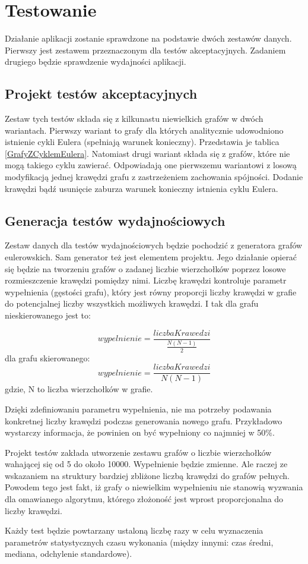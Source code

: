 \section{Testowanie}

Działanie aplikacji zostanie sprawdzone na podstawie dwóch zestawów danych.
Pierwszy jest zestawem przeznaczonym dla testów akceptacyjnych.
Zadaniem drugiego będzie sprawdzenie wydajności aplikacji. 

\subsection{Projekt testów akceptacyjnych}

Zestaw tych testów składa się z kilkunastu niewielkich grafów w dwóch wariantach.
Pierwszy wariant to grafy dla których analitycznie udowodniono istnienie cykli Eulera (spełniają warunek konieczny). Przedstawia je tablica \ref{GrafyZCyklemEulera}.
Natomiast drugi wariant składa się z grafów, które nie mogą takiego cyklu zawierać.
Odpowiadają one pierwszemu wariantowi z losową modyfikacją jednej krawędzi grafu z zastrzeżeniem zachowania spójności. Dodanie krawędzi bądź usunięcie zaburza warunek konieczny istnienia cyklu Eulera.

\subsection{Generacja testów wydajnościowych}

Zestaw danych dla testów wydajnościowych będzie pochodzić z generatora grafów eulerowskich.
Sam generator też jest elementem projektu. 
Jego działanie opierać się będzie na tworzeniu grafów o zadanej liczbie wierzchołków poprzez losowe rozmieszczenie krawędzi pomiędzy nimi.
Liczbę krawędzi kontroluje parametr wypełnienia (gęstości grafu), który jest równy proporcji liczby krawędzi w grafie do potencjalnej liczby wszystkich możliwych krawędzi. I tak dla grafu nieskierowanego jest to:

\[ 
wypelnienie = \frac{liczbaKrawedzi}{\frac{N(N-1)}{2}}
\]
dla grafu skierowanego:
\[ 
wypelnienie = \frac{liczbaKrawedzi}{N(N-1)}
\]
gdzie, N to liczba wierzchołków w grafie.

Dzięki zdefiniowaniu parametru wypełnienia, nie ma potrzeby podawania konkretnej liczby krawędzi podczas generowania nowego grafu. Przykładowo wystarczy informacja, że powinien on być wypełniony co najmniej w 50\%.

Projekt testów zakłada utworzenie zestawu grafów o liczbie wierzchołków wahającej się od 5 do około 10000.
Wypełnienie będzie zmienne. Ale raczej ze wskazaniem na struktury bardziej zbliżone liczbą krawędzi do grafów pełnych.
Powodem tego jest fakt, iż grafy o niewielkim wypełnieniu nie stanowią wyzwania dla omawianego algorytmu, którego złożoność jest wprost proporcjonalna do liczby krawędzi.

Każdy test będzie powtarzany ustaloną liczbę razy w celu wyznaczenia parametrów statystycznych czasu wykonania (między innymi: czas średni, mediana, odchylenie standardowe).


